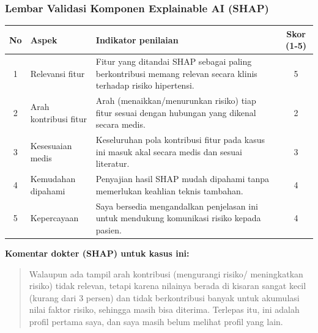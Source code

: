\subsubsection*{Lembar Validasi Komponen Explainable AI (SHAP)}
\begin{center}
\begin{tabular}{|c|p{3.5cm}|p{7.5cm}|c|}
\hline
\textbf{No} & \textbf{Aspek} & \textbf{Indikator penilaian} & \textbf{Skor (1-5)} \\ \hline
1 & Relevansi fitur & Fitur yang ditandai SHAP sebagai paling berkontribusi memang relevan secara klinis terhadap risiko hipertensi. & 5 \\ \hline
2 & Arah kontribusi fitur & Arah (menaikkan/menurunkan risiko) tiap fitur sesuai dengan hubungan yang dikenal secara medis. & 2 \\ \hline
3 & Kesesuaian medis & Keseluruhan pola kontribusi fitur pada kasus ini masuk akal secara medis dan sesuai literatur. & 3 \\ \hline
4 & Kemudahan dipahami & Penyajian hasil SHAP mudah dipahami tanpa memerlukan keahlian teknis tambahan. & 4 \\ \hline
5 & Kepercayaan & Saya bersedia mengandalkan penjelasan ini untuk mendukung komunikasi risiko kepada pasien. & 4 \\ \hline
\end{tabular}
\end{center}

\textbf{Komentar dokter (SHAP) untuk kasus ini:}
\begin{quote}
Walaupun ada tampil arah kontribusi (mengurangi risiko/ meningkatkan risiko) tidak relevan, tetapi karena nilainya berada di kisaran sangat kecil (kurang dari 3 persen) dan tidak berkontribusi banyak untuk akumulasi nilai faktor risiko, sehingga masih bisa diterima. Terlepas itu, ini adalah profil pertama saya, dan saya masih belum melihat profil yang lain.
\end{quote}

